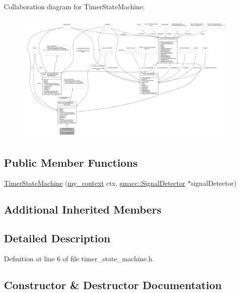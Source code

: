 Collaboration diagram for Timer\+State\+Machine\+:
\nopagebreak
\begin{figure}[H]
\begin{center}
\leavevmode
\includegraphics[width=350pt]{structTimerStateMachine__coll__graph}
\end{center}
\end{figure}
\subsection*{Public Member Functions}
\begin{DoxyCompactItemize}
\item 
\hyperlink{structTimerStateMachine_a6a0feb58b68795fd478ef6425003a456}{Timer\+State\+Machine} (\hyperlink{common_8h_af2dcacead80d69b96952496fe413bbfe}{my\+\_\+context} ctx, \hyperlink{classsmacc_1_1SignalDetector}{smacc\+::\+Signal\+Detector} $\ast$signal\+Detector)
\end{DoxyCompactItemize}
\subsection*{Additional Inherited Members}


\subsection{Detailed Description}


Definition at line 6 of file timer\+\_\+state\+\_\+machine.\+h.



\subsection{Constructor \& Destructor Documentation}
